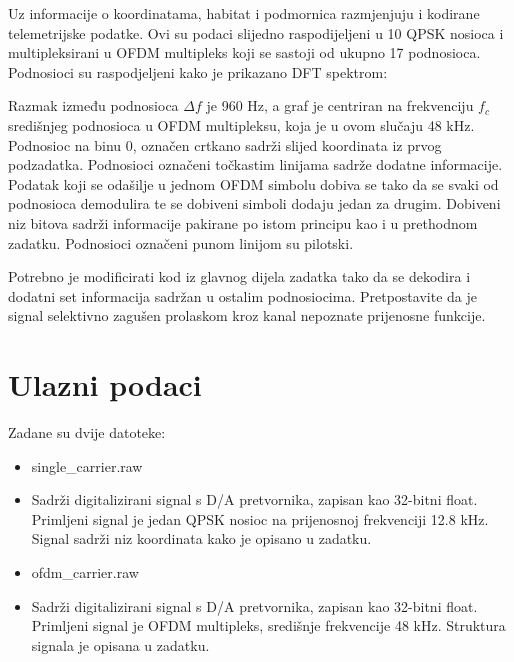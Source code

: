 \documentclass[a4paper]{article}
\begin{document}
Uz informacije o koordinatama, habitat i podmornica razmjenjuju i kodirane telemetrijske podatke. Ovi su podaci slijedno raspodijeljeni u 10 QPSK nosioca i multipleksirani u OFDM  multipleks koji se sastoji od ukupno 17 podnosioca. Podnosioci su raspodjeljeni kako je prikazano DFT spektrom:
\begin{figure}[h!]
	\centering
\end{figure}
Razmak između podnosioca $\varDelta f$ je 960 Hz, a graf je centriran na frekvenciju $f_c$ središnjeg podnosioca u OFDM multipleksu, koja je u ovom slučaju 48 kHz. Podnosioc na binu 0, označen crtkano sadrži slijed koordinata iz prvog podzadatka. Podnosioci označeni točkastim linijama sadrže dodatne informacije. Podatak koji se odašilje u jednom OFDM simbolu dobiva se tako da se svaki od podnosioca demodulira te se dobiveni simboli dodaju jedan za drugim. Dobiveni niz bitova sadrži informacije pakirane po istom principu kao i u prethodnom zadatku. Podnosioci označeni punom linijom su pilotski.

Potrebno je modificirati kod iz glavnog dijela zadatka tako da se dekodira i dodatni set informacija sadržan u ostalim podnosiocima. Pretpostavite da je signal selektivno zagušen prolaskom kroz kanal nepoznate prijenosne funkcije.

\section{Ulazni podaci}
Zadane su dvije datoteke:
\begin{itemize}
\item single\_carrier.raw
\item[] Sadrži digitalizirani signal s D/A pretvornika, zapisan kao 32-bitni float. Primljeni signal je jedan QPSK nosioc na prijenosnoj frekvenciji 12.8 kHz. Signal sadrži niz koordinata kako je opisano u zadatku.
\item ofdm\_carrier.raw
\item[] Sadrži digitalizirani signal s D/A pretvornika, zapisan kao 32-bitni float. Primljeni signal je OFDM multipleks, središnje frekvencije 48 kHz. Struktura signala je opisana u zadatku.
\end{itemize}
\end{document}
